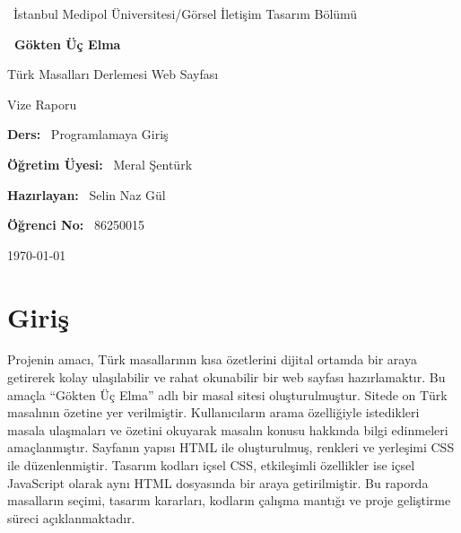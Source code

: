 \documentclass[12pt,a4paper]{article}
\begin{document}
 

\begin{titlepage}
\centering
\vspace*{1cm}
{\large \ İstanbul Medipol Üniversitesi/Görsel İletişim Tasarım Bölümü\par}
\vspace{1.8cm}
{\Huge\bfseries\color{ana} \ Gökten Üç Elma \par}
\vspace{0.4cm}
{\Large Türk Masalları Derlemesi Web Sayfası \par}
{\large Vize Raporu \par}
\vspace{1.8cm}
{\large \textbf{Ders:} \ Programlamaya Giriş \par}
{\large \textbf{Öğretim Üyesi:} \ Meral Şentürk \par}
\vspace{1.2cm}
{\large \textbf{Hazırlayan:} \ Selin Naz Gül \par}
{\large \textbf{Öğrenci No:} \ 86250015 \par}
\vspace{1.8cm}
\vfill
{\large \today \par}
\end{titlepage}

\tableofcontents
\newpage

\section{Giriş}
Projenin amacı, Türk masallarının kısa özetlerini dijital ortamda bir araya getirerek kolay ulaşılabilir ve rahat okunabilir bir web sayfası hazırlamaktır. Bu amaçla “Gökten Üç Elma” adlı bir masal sitesi oluşturulmuştur. Sitede on Türk masalının özetine yer verilmiştir. Kullanıcıların arama özelliğiyle istedikleri masala ulaşmaları ve özetini okuyarak masalın konusu hakkında bilgi edinmeleri amaçlanmıştır. Sayfanın yapısı HTML ile oluşturulmuş, renkleri ve yerleşimi CSS ile düzenlenmiştir. Tasarım kodları içsel CSS, etkileşimli özellikler ise içsel JavaScript olarak aynı HTML dosyasında bir araya getirilmiştir. Bu raporda masalların seçimi, tasarım kararları, kodların çalışma mantığı ve proje geliştirme süreci açıklanmaktadır.
\end{document}
